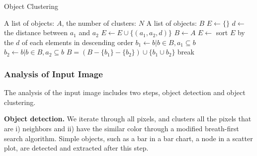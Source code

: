     \begin{algorithm}  
        \caption{Object Clustering} 
        \label{alg:alg2} 
        \begin{algorithmic} %
            \Require A list of objects: $A$, the number of clusters: $N$
            \Ensure A list of objects: $B$
            \State $E \gets \{\}$
                 
                        \State $d \gets$ the distance between $a_1$ and $a_2$
                        \State $E \gets E \cup \{(a_1, a_2, d)\}$
                    \EndIf
                \EndFor
            \EndFor
            \State $B \gets A$
            \State $E \gets$ sort $E$ by the $d$ of each elements in descending order
                \State $b_1 \gets b|b\in B, a_1 \subseteq b$
                \State $b_2 \gets b|b\in B, a_2 \subseteq b$
                    \State $B = (B - \{b_1\} - \{b_2\})\cup \{b_1 \cup b_2\}$
                \EndIf
                    \State break
                \EndIf
            \EndFor
            \State {}
        \end{algorithmic}  
    \end{algorithm} 
    
\subsubsection{Analysis of Input Image}
The analysis of the input image includes two steps, object detection and object clustering.


\textbf{Object detection.} We iterate through all pixels, and clusters all the pixels that are i) neighbors and ii) have the similar color through a modified breath-first search algorithm. Simple objects, such as a bar in a bar chart, a node in a scatter plot, are detected and extracted after this step.


